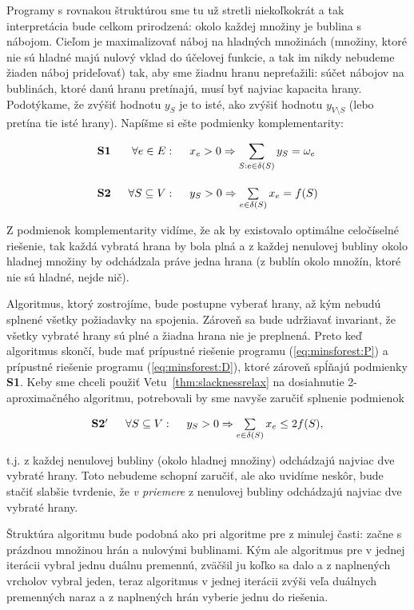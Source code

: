\noindent
Programy s rovnakou štruktúrou sme tu už stretli niekoľkokrát a tak interpretácia bude celkom prirodzená:
okolo každej množiny je bublina s nábojom. Cieľom je maximalizovať náboj na hladných množinách 
(množiny, ktoré nie sú hladné majú nulový vklad do účelovej funkcie, a tak im nikdy nebudeme žiaden náboj prideľovať)
tak, aby sme žiadnu hranu nepreťažili: súčet nábojov na bublinách, ktoré danú hranu pretínajú, musí byť najviac
kapacita hrany. Podotýkame, že zvýšiť hodnotu $y_S$ je to isté, ako zvýšiť hodnotu
$y_{V\setminus S}$ (lebo pretína tie isté hrany). Napíšme si ešte podmienky komplementarity:

$$\begin{array}{lrl}
  {\bf S1} \;\;&\forall e\in E:\;\;&x_e>0\Rightarrow
  \displaystyle\sum\limits_{S:e\in\delta(S)}y_S=\omega_e\\[6ex]
  {\bf S2} \;\;&\forall S\subseteq V:\;\; & y_S>0\Rightarrow \sum\limits_{e\in\delta(S)}x_e=f(S)
\end{array}$$

\noindent
Z podmienok komplementarity vidíme, že ak by existovalo optimálne celočíselné riešenie, tak každá
vybratá hrana by bola plná a z každej nenulovej bubliny okolo hladnej množiny by  odchádzala práve jedna hrana
(z bublín okolo množín, ktoré nie sú hladné, nejde nič).

\noindent
Algoritmus, ktorý zostrojíme, 
bude postupne vyberať hrany, až kým nebudú splnené všetky požiadavky na spojenia. Zároveň
sa bude udržiavať invariant, že všetky vybraté hrany sú plné a žiadna hrana nie je preplnená.
Preto keď algoritmus skončí, bude mať prípustné riešenie programu (\ref{eq:minsforest:P}) a
prípustné riešenie programu (\ref{eq:minsforest:D}), ktoré zároveň spĺňajú podmienky {\bf S1}.
Keby sme chceli použiť Vetu~\ref{thm:slacknessrelax} na dosiahnutie 2-aproximačného algoritmu,
potrebovali by sme navyše zaručiť splnenie podmienok

$$\begin{array}{lrl}
  {\bf S2'} \;\;&\forall S\subseteq V:\;\; & y_S>0\Rightarrow \sum\limits_{e\in\delta(S)}x_e\le2f(S),
\end{array}$$

\noindent t.j. z každej nenulovej bubliny (okolo hladnej množiny) odchádzajú
najviac dve vybraté hrany. Toto nebudeme schopní zaručiť, ale ako uvidíme
neskôr, bude stačiť slabšie tvrdenie, že {\em v priemere} z nenulovej bubliny
odchádzajú najviac dve vybraté hrany.

\noindent Štruktúra algoritmu bude podobná ako pri algoritme pre \minvcover z
minulej časti: začne s prázdnou množinou hrán a nulovými bublinami.  Kým ale
algoritmus pre \minvcover v jednej iterácii vybral jednu duálnu premennú,
zväčšil ju koľko sa dalo a z naplnených vrcholov vybral jeden, teraz algoritmus
v jednej iterácii zvýši veľa duálnych premenných naraz a z naplnených hrán
vyberie jednu do riešenia.

